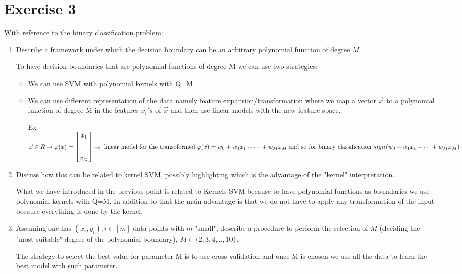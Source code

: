 \documentclass[a4paper,11pt,oneside]{book}
\begin{document}
\section{Exercise 3}
With reference to the binary classification problem:
\begin{enumerate}
\item Describe a framework under which the decision boundary can be an arbitrary polynomial function of degree $M$.
    \begin{solution}
        To have decision boundaries that are polynomial functions of degree M we can use two strategies:
        
        \begin{itemize}
        \item We can use SVM with polynomial kernels with Q=M
        
        \item We can use different representation of the data namely feature expansion/transformation where we map a vector $\vec{x}$ to a polynomial function of degree M in the features $x_i's$ of $\vec{x}$ and then use linear models with the new feature space.
        
        Ex $\vec{x} \in R \to \varphi(\vec{x}) = \begin{bmatrix}
        x_1 \\
        . \\
        . \\
        x_M
        \end{bmatrix} \to \text{ linear model for the transoformed } \\ \varphi(\vec{x}) = w_0+w_1x_1 + \cdots + w_Mx_M \text{ and so for binary classification } \\ sign(w_0+w_1x_1 + \cdots + w_Mx_M)$
        \end{itemize}
    \end{solution}
\item Discuss how this can be related to kernel SVM, possibly highlighting which is the advantage of the "kernel" interpretation.
    \begin{solution}
        What we have introduced in the previous point is related to Kernels SVM because to have polynomial functions as boundaries we use polynomial kernels with Q=M. In addition to that the main advantage is that we do not have to apply any transformation of the input because everything is done by the kernel.
    \end{solution}
\clearpage
\item Assuming one has $(x_i, y_i), i \in [m]$ data points with $m$ "small", describe a procedure to perform the selection of $M$ (deciding the "most suitable" degree of the polynomial boundary), $M \in \{2, 3, 4, .., 10\}$.
    \begin{solution}
        The strategy to select the best value for parameter M is to use cross-validation and once M is chosen we use all the data to learn the best model with such parameter.
        

\end{solution}
\end{enumerate}
\end{document}
